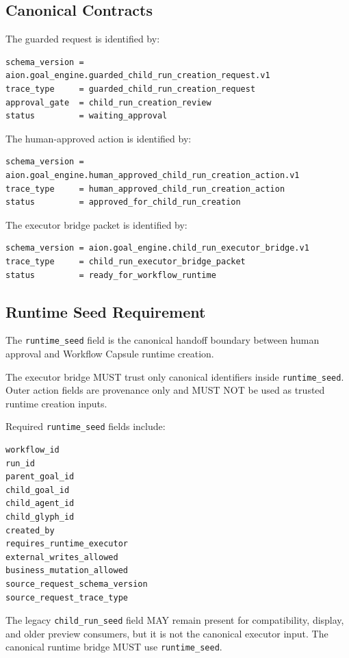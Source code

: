 \subsection{Canonical Contracts}

The guarded request is identified by:

\begin{verbatim}
schema_version = aion.goal_engine.guarded_child_run_creation_request.v1
trace_type     = guarded_child_run_creation_request
approval_gate  = child_run_creation_review
status         = waiting_approval
\end{verbatim}

The human-approved action is identified by:

\begin{verbatim}
schema_version = aion.goal_engine.human_approved_child_run_creation_action.v1
trace_type     = human_approved_child_run_creation_action
status         = approved_for_child_run_creation
\end{verbatim}

The executor bridge packet is identified by:

\begin{verbatim}
schema_version = aion.goal_engine.child_run_executor_bridge.v1
trace_type     = child_run_executor_bridge_packet
status         = ready_for_workflow_runtime
\end{verbatim}

\subsection{Runtime Seed Requirement}

The \texttt{runtime\_seed} field is the canonical handoff boundary between human approval and Workflow Capsule runtime creation.

The executor bridge MUST trust only canonical identifiers inside \texttt{runtime\_seed}. Outer action fields are provenance only and MUST NOT be used as trusted runtime creation inputs.

Required \texttt{runtime\_seed} fields include:

\begin{verbatim}
workflow_id
run_id
parent_goal_id
child_goal_id
child_agent_id
child_glyph_id
created_by
requires_runtime_executor
external_writes_allowed
business_mutation_allowed
source_request_schema_version
source_request_trace_type
\end{verbatim}

The legacy \texttt{child\_run\_seed} field MAY remain present for compatibility, display, and older preview consumers, but it is not the canonical executor input. The canonical runtime bridge MUST use \texttt{runtime\_seed}.

